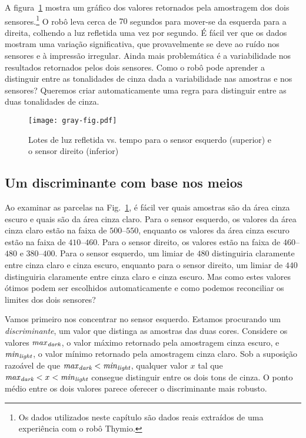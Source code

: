 A figura~\ref{fig.closegrays2} mostra um gráfico dos valores retornados pela amostragem dos dois sensores.\footnote{Os dados utilizados neste capítulo são dados reais extraídos de uma experiência com o robô Thymio.} O robô leva cerca de $70$ segundos para mover-se da esquerda para a direita, colhendo a luz refletida uma vez por segundo. É fácil ver que os dados mostram uma variação significativa, que provavelmente se deve ao ruído nos sensores e à impressão irregular. Ainda mais problemática é a variabilidade nos resultados retornados pelos dois sensores. Como o robô pode aprender a distinguir entre as tonalidades de cinza dada a variabilidade nas amostras e nos sensores? Queremos criar automaticamente uma regra para distinguir entre as duas tonalidades de cinza.

\begin{figure}
\begin{center}
\texttt{[image: gray-fig.pdf]}
\end{center}
\caption{Lotes de luz refletida vs. tempo para o sensor esquerdo (superior) e o sensor direito (inferior)}\label{fig.closegrays2}
\end{figure}

\subsection{Um discriminante com base nos meios}

Ao examinar as parcelas na Fig.~\ref{fig.closegrays2}, é fácil ver quais amostras são da área cinza escuro e quais são da área cinza claro. Para o sensor esquerdo, os valores da área cinza claro estão na faixa de $500$--$550$, enquanto os valores da área cinza escuro estão na faixa de $410$--$460$. Para o sensor direito, os valores estão na faixa de $460$--$480$ e $380$--$400$. Para o sensor esquerdo, um limiar de $480$ distinguiria claramente entre cinza claro e cinza escuro, enquanto para o sensor direito, um limiar de $440$ distinguiria claramente entre cinza claro e cinza escuro. Mas como estes valores ótimos podem ser escolhidos automaticamente e como podemos reconciliar os limites dos dois sensores?

Vamos primeiro nos concentrar no sensor esquerdo. Estamos procurando um \emph{discriminante}, um valor que distinga as amostras das duas cores. Considere os valores $\mathit{max}_{\textit{\scriptsize dark}}$, o valor máximo retornado pela amostragem cinza escuro, e $\mathit{min}_{\textit{\scriptsize light}}$, o valor mínimo retornado pela amostragem cinza claro. Sob a suposição razoável de que  $\mathit{max}_{\textit{\scriptsize dark}} <\mathit{min}_{\textit{\scriptsize light}}$, qualquer valor $x$ tal que $\mathit{max}_{\textit{\scriptsize dark}} < x <\mathit{min}_{\textit{\scriptsize light}}$ consegue distinguir entre os dois tons de cinza. O ponto médio entre os dois valores parece oferecer o discriminante mais robusto.

